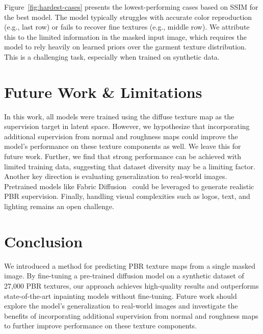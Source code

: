 \documentclass[11pt,twocolumn]{article}
\begin{document}
Figure~\ref{fig:hardest-cases} presents the lowest-performing cases based on SSIM for the 
best model. The model typically struggles with accurate color reproduction (e.g., last row) 
or fails to recover fine textures (e.g., middle row). We attribute this to the limited 
information in the masked input image, which requires the model to rely heavily on 
learned priors over the garment texture distribution. This is a challenging task, 
especially when trained on synthetic data.


\section{Future Work \& Limitations}
In this work, all models were trained using the diffuse texture map as the supervision target 
in latent space. However, we hypothesize that incorporating additional supervision from normal and 
roughness maps could improve the model's performance on these texture components as well. We leave this 
for future work. Further, we find that strong performance can be achieved with limited training data, 
suggesting that dataset diversity may be a limiting factor. Another key direction is evaluating generalization to real-world images. 
Pretrained models like Fabric Diffusion~\cite{fabricdiffusion} could be leveraged to generate realistic PBR supervision. 
Finally, handling visual complexities such as logos, text, and lighting remains an open challenge.

\section{Conclusion}
We introduced a method for predicting PBR texture maps from a single masked image. 
By fine-tuning a pre-trained diffusion model on a synthetic dataset of 27,000 PBR textures, 
our approach achieves high-quality results and outperforms state-of-the-art inpainting models 
without fine-tuning. Future work should explore the model's generalization to real-world images and 
investigate the benefits of incorporating additional supervision from normal and roughness maps 
to further improve performance on these texture components.

\newpage


\end{document}
